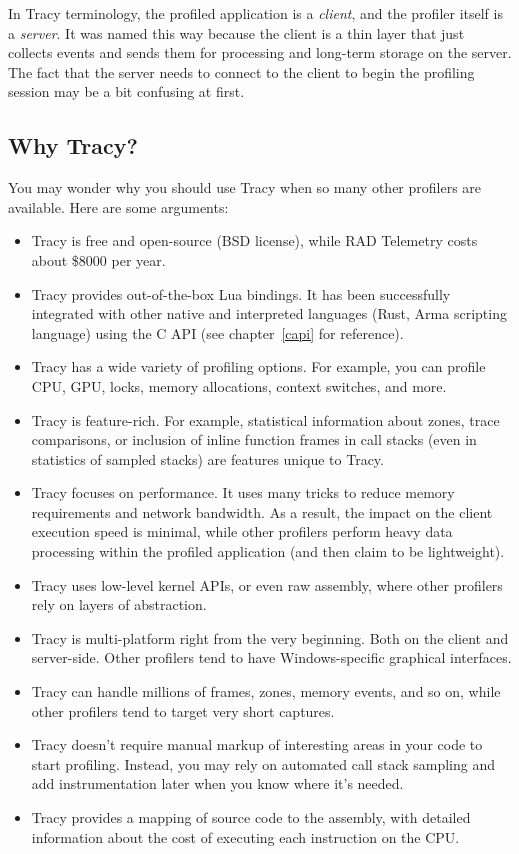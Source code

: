\documentclass[hidelinks,titlepage,a4paper,twoside]{article}
\begin{document}
In Tracy terminology, the profiled application is a \emph{client}, and the profiler itself is a \emph{server}. It was named this way because the client is a thin layer that just collects events and sends them for processing and long-term storage on the server. The fact that the server needs to connect to the client to begin the profiling session may be a bit confusing at first.

\subsection{Why Tracy?}

You may wonder why you should use Tracy when so many other profilers are available. Here are some arguments:

\begin{itemize}
\item Tracy is free and open-source (BSD license), while RAD Telemetry costs about \$8000 per year.
\item Tracy provides out-of-the-box Lua bindings. It has been successfully integrated with other native and interpreted languages (Rust, Arma scripting language) using the C API (see chapter~\ref{capi} for reference).
\item Tracy has a wide variety of profiling options. For example, you can profile CPU, GPU, locks, memory allocations, context switches, and more.
\item Tracy is feature-rich. For example, statistical information about zones, trace comparisons, or inclusion of inline function frames in call stacks (even in statistics of sampled stacks) are features unique to Tracy.
\item Tracy focuses on performance. It uses many tricks to reduce memory requirements and network bandwidth. As a result, the impact on the client execution speed is minimal, while other profilers perform heavy data processing within the profiled application (and then claim to be lightweight).
\item Tracy uses low-level kernel APIs, or even raw assembly, where other profilers rely on layers of abstraction.
\item Tracy is multi-platform right from the very beginning. Both on the client and server-side. Other profilers tend to have Windows-specific graphical interfaces.
\item Tracy can handle millions of frames, zones, memory events, and so on, while other profilers tend to target very short captures.
\item Tracy doesn't require manual markup of interesting areas in your code to start profiling. Instead, you may rely on automated call stack sampling and add instrumentation later when you know where it's needed.
\item Tracy provides a mapping of source code to the assembly, with detailed information about the cost of executing each instruction on the CPU.
\end{itemize}
\end{document}
